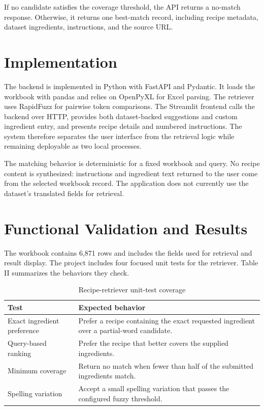 \documentclass[conference]{IEEEtran}
\begin{document}
If no candidate satisfies the coverage threshold, the API returns a no-match response. Otherwise, it returns one best-match record, including recipe metadata, dataset ingredients, instructions, and the source URL.

\section{Implementation}
The backend is implemented in Python with FastAPI and Pydantic. It loads the workbook with pandas and relies on OpenPyXL for Excel parsing. The retriever uses RapidFuzz for pairwise token comparisons. The Streamlit frontend calls the backend over HTTP, provides both dataset-backed suggestions and custom ingredient entry, and presents recipe details and numbered instructions. The system therefore separates the user interface from the retrieval logic while remaining deployable as two local processes.

The matching behavior is deterministic for a fixed workbook and query. No recipe content is synthesized: instructions and ingredient text returned to the user come from the selected workbook record. The application does not currently use the dataset's translated fields for retrieval.

\section{Functional Validation and Results}
The workbook contains 6,871 rows and includes the fields used for retrieval and result display. The project includes four focused unit tests for the retriever. Table II summarizes the behaviors they check.

\begin{table}[htbp]
\caption{Recipe-retriever unit-test coverage}
\label{tab:tests}
\centering
\begin{tabular}{|p{}|p{}|}
\hline
\textbf{Test} & \textbf{Expected behavior}\\
\hline
Exact ingredient preference & Prefer a recipe containing the exact requested ingredient over a partial-word candidate.\\
\hline
Query-based ranking & Prefer the recipe that better covers the supplied ingredients.\\
\hline
Minimum coverage & Return no match when fewer than half of the submitted ingredients match.\\
\hline
Spelling variation & Accept a small spelling variation that passes the configured fuzzy threshold.\\
\hline
\end{tabular}
\end{table}
\end{document}
